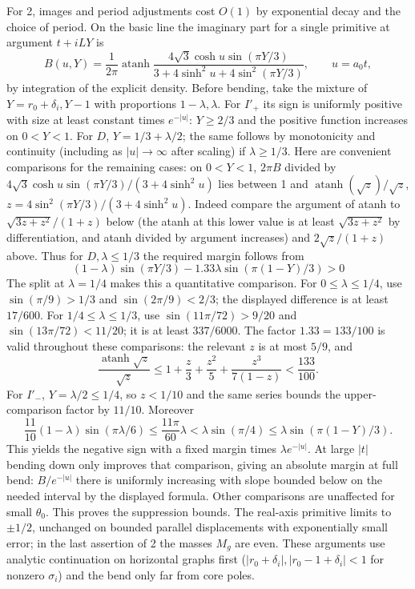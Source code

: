 For 2, images and period adjustments cost \(O(1)\) by exponential decay and the choice of period. On the basic line the imaginary part for a single primitive at argument \(t+iLY\) is
\[
 B(u,Y)=\frac1{2\pi}\operatorname{atanh}
 \frac{4\sqrt3\cosh u\sin(\pi Y/3)}{3+4\sinh^2u+4\sin^2(\pi Y/3)},\qquad u=a_0 t ,
\]
by integration of the explicit density. Before bending, take the mixture of \(Y=r_0+\delta_i,Y-1\) with proportions \(1-\lambda,\lambda\). For \(I'_+\) its sign is uniformly positive with size at least constant times \(e^{-|u|}\): \(Y\ge2/3\) and the positive function increases on \(0<Y<1\). For \(D\), \(Y=1/3+\lambda/2\); the same follows by monotonicity and continuity (including as \(|u|\to\infty\) after scaling) if \(\lambda\ge1/3\). Here are convenient comparisons for the remaining cases: on \(0<Y<1\), \(2\pi B\) divided by \(4\sqrt3\cosh u\sin(\pi Y/3)/(3+4\sinh^2 u)\) lies between 1 and \(\operatorname{atanh}(\sqrt z)/\sqrt z\), \(z=4\sin^2(\pi Y/3)/(3+4\sinh^2u)\). Indeed compare the argument of atanh to \(\sqrt{3z+z^2}/(1+z)\) below (the atanh at this lower value is at least \(\sqrt{3z+z^2}\) by differentiation, and atanh divided by argument increases) and \(2\sqrt z/(1+z)\) above. Thus for \(D,\lambda\le1/3\) the required margin follows from
\[
 (1-\lambda)\sin(\pi Y/3)-1.33\lambda\sin(\pi(1-Y)/3)>0
\]
The split at $\lambda=1/4$ makes this a quantitative comparison.
For $0\le\lambda\le1/4$, use
$\sin(\pi/9)>1/3$ and $\sin(2\pi/9)<2/3$; the displayed difference is
at least $17/600$.  For $1/4\le\lambda\le1/3$, use
$\sin(11\pi/72)>9/20$ and $\sin(13\pi/72)<11/20$; it is at least
$337/6000$.  The factor $1.33=133/100$ is valid throughout these
comparisons: the relevant $z$ is at most $5/9$, and
\[
 \frac{\operatorname{atanh}\sqrt z}{\sqrt z}
 \le 1+\frac z3+\frac{z^2}5+\frac{z^3}{7(1-z)}<\frac{133}{100}.
\]
For \(I'_-\), \(Y=\lambda/2\le1/4\), so $z<1/10$ and the same series
bounds the upper-comparison factor by $11/10$.  Moreover
\[
 \frac{11}{10}(1-\lambda)\sin(\pi\lambda/6)
 \le \frac{11\pi}{60}\lambda
 <\lambda\sin(\pi/4)
 \le \lambda\sin(\pi(1-Y)/3).
\]
This yields the negative sign with a fixed margin times
\(\lambda e^{-|u|}\). At large \(|t|\) bending down only improves that comparison, giving an absolute margin at full bend: \(B/e^{-|u|}\) there is uniformly increasing with slope bounded below on the needed interval by the displayed formula. Other comparisons are unaffected for small \(\theta_0\). This proves the suppression bounds. The real-axis primitive limits to \(\pm1/2\), unchanged on bounded parallel displacements with exponentially small error; in the last assertion of 2 the masses \(M_g\) are even. These arguments use analytic continuation on horizontal graphs first (\(|r_0+\delta_i|,|r_0-1+\delta_i|<1\) for nonzero \(\sigma_i\)) and the bend only far from core poles.



